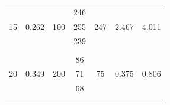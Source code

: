 \documentclass[%
 reprint,
nofootinbib,
 amsmath,amssymb,
 aps,
floatfix,
]{revtex4-2}
\begin{document}
\begin{table}[]
\begin{tabular}{@{}ccccccc@{}}
    \multirow{3}{*}{15}                                     & \multirow{3}{*}{0.262}                                         & \multirow{3}{*}{100}                                    & 246          & \multirow{3}{*}{247}                                                 & \multirow{3}{*}{2.467}                                              & \multirow{3}{*}{4.011}                                                            \\
                                                            &                                                                &                                                         & 255          &                                                                      &                                                                     &                                                                                   \\
                                                            &                                                                &                                                         & 239          &                                                                      &                                                                     &  \\                                                                                  \\
    \multirow{3}{*}{20}                                     & \multirow{3}{*}{0.349}                                         & \multirow{3}{*}{200}                                    & 86           & \multirow{3}{*}{75}                                                  & \multirow{3}{*}{0.375}                                              & \multirow{3}{*}{0.806}                                                            \\
                                                            &                                                                &                                                         & 71           &                                                                      &                                                                     &                                                                                   \\
                                                            &                                                                &                                                         & 68           &                                                                      &                                                                     &   \\                                                                                \\

\end{tabular}
\end{table}
\end{document}
